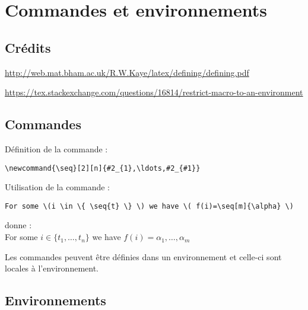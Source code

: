 \chapter{Commandes et environnements}
\minitoc


\newpage
\section{Crédits}

\url{http://web.mat.bham.ac.uk/R.W.Kaye/latex/defining/defining.pdf}


\url{https://tex.stackexchange.com/questions/16814/restrict-macro-to-an-environment}

\section{Commandes}

\newcommand{\seq}[2][n]{#2_{1},\ldots,#2_{#1}}
Définition de la commande :
\begin{verbatim}
\newcommand{\seq}[2][n]{#2_{1},\ldots,#2_{#1}}
\end{verbatim}


Utilisation de la commande :
\begin{verbatim}
For some \(i \in \{ \seq{t} \} \) we have \( f(i)=\seq[m]{\alpha} \)
\end{verbatim}
donne :\\
For some \(i \in \{ \seq{t} \} \) we have \( f(i)=\seq[m]{\alpha} \)

\bigskip
\par
Les commandes peuvent être définies dans un environnement et celle-ci sont locales à l'environnement.

\section{Environnements}

\newenvironment{qsi}[1]%
{\begin{quote}#1 wrote,\begin{sloppypar}\it}%
{\end{sloppypar}\end{quote}}



\newenvironment{quote2}[1]%
{
  \begin{quote}#1 wrote,\begin{sloppypar}\it
  \newcommand{\gf}[1]{\mathbb{F}_{##1}}
}%
{
  \end{sloppypar}\end{quote}
}


